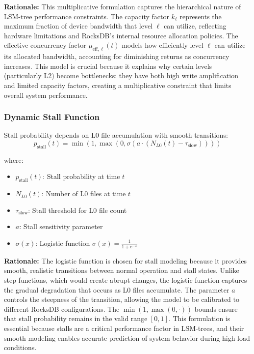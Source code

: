\documentclass[11pt]{article}
\newcommand{\pstall}{p_{\text{stall}}}
\begin{document}
\textbf{Rationale:} This multiplicative formulation captures the hierarchical nature of LSM-tree performance constraints. The capacity factor $k_\ell$ represents the maximum fraction of device bandwidth that level $\ell$ can utilize, reflecting hardware limitations and RocksDB's internal resource allocation policies. The effective concurrency factor $\mu_{\text{eff},\ell}(t)$ models how efficiently level $\ell$ can utilize its allocated bandwidth, accounting for diminishing returns as concurrency increases. This model is crucial because it explains why certain levels (particularly L2) become bottlenecks: they have both high write amplification and limited capacity factors, creating a multiplicative constraint that limits overall system performance.

\subsubsection{Dynamic Stall Function}
Stall probability depends on L0 file accumulation with smooth transitions:
\begin{equation}
\pstall(t) = \min(1, \max(0, \sigma(a \cdot (N_{L0}(t) - \tau_{\text{slow}}))))
\end{equation}

where:
\begin{itemize}
    \item $p_{\text{stall}}(t)$: Stall probability at time $t$
    \item $N_{L0}(t)$: Number of L0 files at time $t$
    \item $\tau_{\text{slow}}$: Stall threshold for L0 file count
    \item $a$: Stall sensitivity parameter
    \item $\sigma(x)$: Logistic function $\sigma(x) = \frac{1}{1 + e^{-x}}$
\end{itemize}

\textbf{Rationale:} The logistic function is chosen for stall modeling because it provides smooth, realistic transitions between normal operation and stall states. Unlike step functions, which would create abrupt changes, the logistic function captures the gradual degradation that occurs as L0 files accumulate. The parameter $a$ controls the steepness of the transition, allowing the model to be calibrated to different RocksDB configurations. The $\min(1, \max(0, \cdot))$ bounds ensure that stall probability remains in the valid range $[0,1]$. This formulation is essential because stalls are a critical performance factor in LSM-trees, and their smooth modeling enables accurate prediction of system behavior during high-load conditions.
\end{document}

